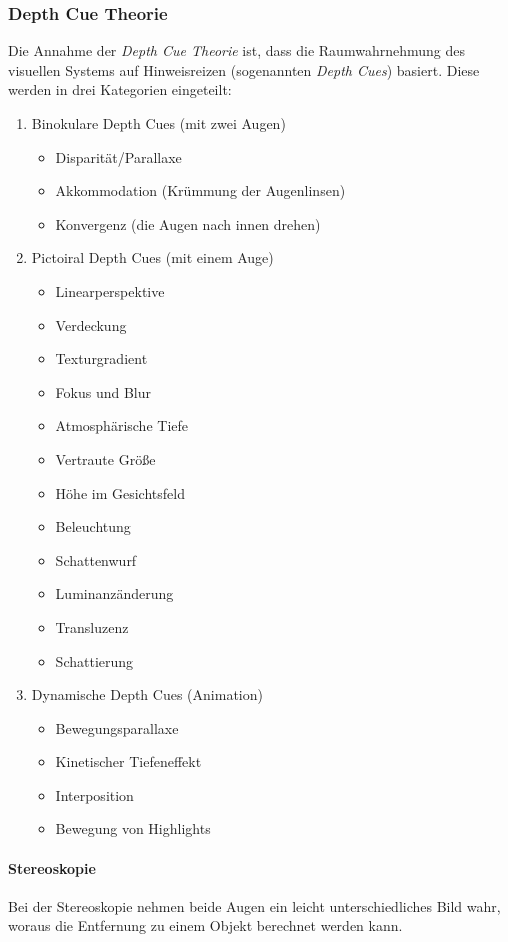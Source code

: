 			\subsubsection{Depth Cue Theorie}
				Die Annahme der \emph{Depth Cue Theorie} ist, dass die Raumwahrnehmung des visuellen Systems auf Hinweisreizen (sogenannten \emph{Depth Cues}) basiert. Diese werden in drei Kategorien eingeteilt:
				\begin{enumerate}
					\item Binokulare Depth Cues (mit zwei Augen)
						\begin{itemize}
							\item Disparität/Parallaxe
							\item Akkommodation (Krümmung der Augenlinsen)
							\item Konvergenz (die Augen nach innen drehen)
						\end{itemize}
					\item Pictoiral Depth Cues (mit einem Auge)
						\begin{itemize}
							\item Linearperspektive
							\item Verdeckung
							\item Texturgradient
							\item Fokus und Blur
							\item Atmosphärische Tiefe
							\item Vertraute Größe
							\item Höhe im Gesichtsfeld
							\item Beleuchtung
							\item Schattenwurf
							\item Luminanzänderung
							\item Transluzenz
							\item Schattierung
						\end{itemize}
					\item Dynamische Depth Cues (Animation)
						\begin{itemize}
							\item Bewegungsparallaxe
							\item Kinetischer Tiefeneffekt
							\item Interposition
							\item Bewegung von Highlights
						\end{itemize}
				\end{enumerate}

				\paragraph{Stereoskopie}
					Bei der Stereoskopie nehmen beide Augen ein leicht unterschiedliches Bild wahr, woraus die Entfernung zu einem Objekt berechnet werden kann.

